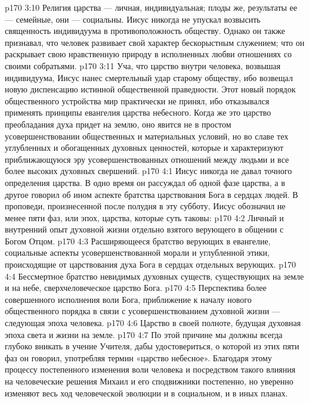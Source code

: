 \vs p170 3:10 Религия царства --- личная, индивидуальная; плоды же, результаты ее --- семейные, они --- социальны. Иисус никогда не упускал возвысить священность индивидуума в противоположность обществу. Однако он также признавал, что человек развивает свой характер бескорыстным служением; что он раскрывает свою нравственную природу в исполненных любви отношениях со своими собратьями.
\vs p170 3:11 Уча, что царство внутри человека, возвышая индивидуума, Иисус нанес смертельный удар старому обществу, ибо возвещал новую диспенсацию истинной общественной праведности. Этот новый порядок общественного устройства мир практически не принял, ибо отказывался применять принципы евангелия царства небесного. Когда же это царство преобладания духа придет на землю, оно явится не в простом усовершенствовании общественных и материальных условий, но во славе тех углубленных и обогащенных духовных ценностей, которые и характеризуют приближающуюся эру усовершенствованных отношений между людьми и все более высоких духовных свершений.
\vs p170 4:1 Иисус никогда не давал точного определения царства. В одно время он рассуждал об одной фазе царства, а в другое говорил об ином аспекте братства царствования Бога в сердцах людей. В проповеди, произнесенной после полудня в эту субботу, Иисус обозначил не менее пяти фаз, или эпох, царства, которые суть таковы:
\vs p170 4:2 \bibnobreakspace Личный и внутренний опыт духовной жизни отдельно взятого верующего в общении с Богом Отцом.
\vs p170 4:3 \bibnobreakspace Расширяющееся братство верующих в евангелие, социальные аспекты усовершенствованной морали и углубленной этики, происходящие от царствования духа Бога в сердцах отдельных верующих.
\vs p170 4:4 \bibnobreakspace Бессмертное братство невидимых духовных существ, существующих на земле и на небе, сверхчеловеческое царство Бога.
\vs p170 4:5 \bibnobreakspace Перспектива более совершенного исполнения воли Бога, приближение к началу нового общественного порядка в связи с усовершенствованием духовной жизни --- следующая эпоха человека.
\vs p170 4:6 \bibnobreakspace Царство в своей полноте, будущая духовная эпоха света и жизни на земле.
\vs p170 4:7 \pc По этой причине мы должны всегда глубоко вникать в учение Учителя, дабы удостовериться, о которой из этих пяти фаз он говорил, употребляя термин «царство небесное». Благодаря этому процессу постепенного изменения воли человека и посредством такого влияния на человеческие решения Михаил и его сподвижники постепенно, но уверенно изменяют весь ход человеческой эволюции и в социальном, и в иных планах.

